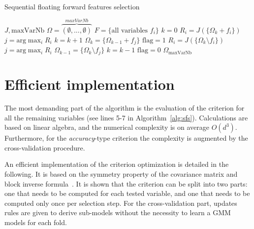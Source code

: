 \documentclass[journal,10pt]{IEEEtran}
\begin{document}
        \begin{algorithm}
        \caption{Sequential floating forward features selection\label{alg:sffs}}
        {\footnotesize
        \begin{algorithmic}[1]
        \REQUIRE $J,\text{maxVarNb}$
        \STATE $\Omega=\overbrace{(\emptyset,...,\emptyset)}^{maxVarNb}$
        \STATE $F=\text{\{all variables $f_i$\}}$
        \STATE $k=0$
        \STATE $R_i = J(\{\Omega_k + f_i\})$
        \ENDFOR
        \STATE $j=\text{arg} \max_{i} R_i$
        \STATE $k=k+1$
        \STATE $\Omega_k = \{\Omega_{k-1} + f_j\}$
        \STATE $\text{flag}=1$
        \STATE $R_i = J(\{\Omega_k \setminus f_i\})$
        \ENDFOR
        \STATE $j=\text{arg} \max_{i} R_i$
        \STATE $\Omega_{k-1} = \{\Omega_k \setminus f_j\}$
        \STATE $k=k-1$
        \ELSE
        \STATE $\text{flag}=0$
        \ENDIF
        \ENDWHILE
        \ENDIF
        \ENDWHILE
        \RETURN $\Omega_{\text{maxVarNb}}$
        \end{algorithmic}
        }
        \end{algorithm}


\section{Efficient implementation}
\label{sec:implementation}
The most  demanding part  of the  algorithm is  the evaluation  of the
criterion  for  all   the  remaining  variables  (see   lines  5-7  in
Algorithm~\ref{alg:sfs}). Calculations are based on linear algebra, and the
numerical  complexity is  on average  $O(d^3)$.  Furthermore,  for the
\emph{accuracy}-type  criterion the  complexity  is  augmented by  the
cross-validation procedure.

An efficient implementation of  the criterion optimization is detailed
in  the following.   It  is  based on  the  symmetry  property of  the
covariance matrix  and block inverse  formula~\cite{IMM2012-03274}.  It is shown  that the criterion  can be split  into two
parts: one that needs to be computed for each tested variable, and one
that  needs to  be  computed only  once per  selection  step. For  the
cross-validation part,  updates rules  are given to  derive sub-models
without the necessity to learn a GMM models for each fold.
\end{document}
